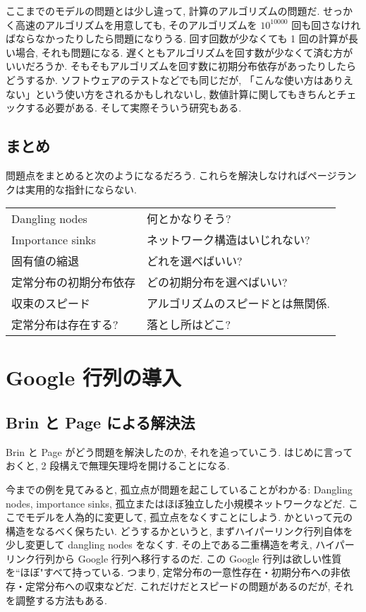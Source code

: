 \documentclass[openany, a4paper, oneside]{jsbook}
\begin{document}
ここまでのモデルの問題とは少し違って, 計算のアルゴリズムの問題だ.
せっかく高速のアルゴリズムを用意しても,
そのアルゴリズムを $10^{10000}$ 回も回さなければならなかったりしたら問題になりうる.
回す回数が少なくても 1 回の計算が長い場合, それも問題になる.
遅くともアルゴリズムを回す数が少なくて済む方がいいだろうか.
そもそもアルゴリズムを回す数に初期分布依存があったりしたらどうするか.
ソフトウェアのテストなどでも同じだが,
「こんな使い方はありえない」という使い方をされるかもしれないし,
数値計算に関してもきちんとチェックする必要がある.
そして実際そういう研究もある.
\subsection{まとめ}

問題点をまとめると次のようになるだろう.
これらを解決しなければページランクは実用的な指針にならない.
\begin{center}
\begin{tabular}{ll}
Dangling nodes & 何とかなりそう?\\
Importance sinks & ネットワーク構造はいじれない?\\
固有値の縮退 & どれを選べばいい?\\
定常分布の初期分布依存 & どの初期分布を選べばいい?\\
収束のスピード & アルゴリズムのスピードとは無関係.\\
定常分布は存在する? & 落とし所はどこ?\\
\end{tabular}
\end{center}
\section{Google 行列の導入}

\subsection{Brin と Page による解決法}

Brin と Page がどう問題を解決したのか, それを追っていこう.
はじめに言っておくと, 2 段構えで無理矢理埒を開けることになる.

今までの例を見てみると, 孤立点が問題を起こしていることがわかる:
Dangling nodes, importance sinks, 孤立またはほぼ独立した小規模ネットワークなどだ.
ここでモデルを人為的に変更して, 孤立点をなくすことにしよう.
かといって元の構造をなるべく保ちたい.
どうするかというと, まずハイパーリンク行列自体を少し変更して dangling nodes をなくす.
その上である二重構造を考え, ハイパーリンク行列から Google 行列へ移行するのだ.
この Google 行列は欲しい性質を``ほぼ"すべて持っている.
つまり, 定常分布の一意性存在・初期分布への非依存・定常分布への収束などだ.
これだけだとスピードの問題があるのだが, それを調整する方法もある.
\end{document}
